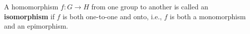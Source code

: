 A homomorphism $f \colon G \to H$ from one group to another is called an \textbf{isomorphism} if $f$ is both one-to-one and onto, i.e., $f$ is both a monomorphism and an epimorphism.

